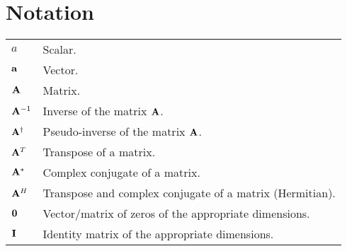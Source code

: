 \chapter*{Notation}

{ %
\renewcommand{\arraystretch}{1.5}

\begin{longtabu} to \textwidth {lX}
$a$ & Scalar. \\
$\aa$ & Vector. \\
$\AA$ & Matrix. \\
$\AA^{-1}$ & Inverse of the matrix $\AA$. \\
$\AA^\dagger$ & Pseudo-inverse of the matrix $\AA$. \\
$\AA^T$ & Transpose of a matrix. \\
$\AA^\ast$ & Complex conjugate of a matrix. \\
$\AA^H$ & Transpose and complex conjugate of a matrix
    (Hermitian). \\
$\zero$ & Vector/matrix of zeros of the appropriate dimensions. \\
$\eye$ & Identity matrix of the appropriate dimensions. \\


\end{longtabu}}
